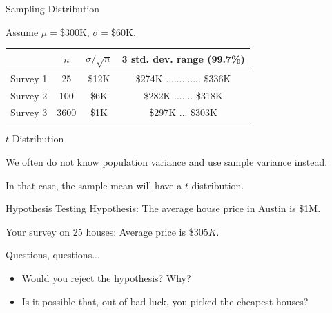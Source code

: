 \documentclass{beamer}\usepackage[]{graphicx}\usepackage[]{color}
\begin{document}
\begin{darkframes}
    
    
    \begin{frame}[label=lists]{Sampling Distribution}
    
    Assume $\mu=$\$300K, $\sigma=$\$60K. \newline
    
   	\begin{table}[!b]
        {\carlitoTLF %
        \begin{tabularx}{\textwidth}{Xccc}
          \textbf{} &  $n$ & $\sigma/\sqrt{n}$  & 3 std. dev. range (99.7\%) \\
          \toprule
          Survey 1     & 25   &  \$12K	&\$274K ............. \$336K   \\
          Survey 2     & 100  &  \$6K	&\$282K ....... \$318K   \\
		  Survey 3     & 3600 &  \$1K	&\$297K ... \$303K   \\
          \bottomrule
        \end{tabularx}}	
	\end{table}   
    
    \end{frame}
    
    
	
	

    
    
    \begin{frame}[label=lists]{$t$ Distribution}
    
    	We often do not know population variance and use sample variance instead. \newline
    	
    	
		In that case, the sample mean will have a \alert{$t$ distribution}.
	\end{frame}	
    
    
    
    \begin{frame}[label=lists]{Hypothesis Testing}
    Hypothesis: The average house price in Austin is \$1M.
    
    Your survey on 25 houses: Average price is \$$305K$. \newline
    
    Questions, questions...
    \begin{itemize}
   \item Would you reject the hypothesis? Why?
    
   \item Is it possible that, out of bad luck, you picked the cheapest houses?
    

\end{itemize}
\end{frame}
\end{darkframes}
\end{document}
